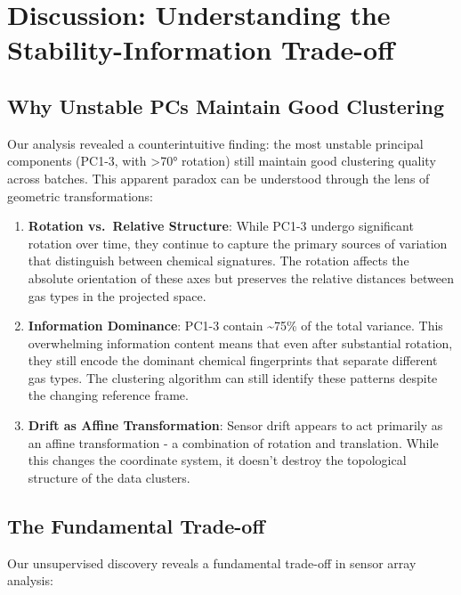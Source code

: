 \documentclass[
  letterpaper,
  DIV=11,
  numbers=noendperiod]{scrartcl}
\begin{document}
\section{Discussion: Understanding the Stability-Information
Trade-off}\label{discussion-understanding-the-stability-information-trade-off}

\subsection{Why Unstable PCs Maintain Good
Clustering}\label{why-unstable-pcs-maintain-good-clustering}

Our analysis revealed a counterintuitive finding: the most unstable
principal components (PC1-3, with \textgreater70° rotation) still
maintain good clustering quality across batches. This apparent paradox
can be understood through the lens of geometric transformations:

\begin{enumerate}
\def\labelenumi{\arabic{enumi}.}
\item
  \textbf{Rotation vs.~Relative Structure}: While PC1-3 undergo
  significant rotation over time, they continue to capture the primary
  sources of variation that distinguish between chemical signatures. The
  rotation affects the absolute orientation of these axes but preserves
  the relative distances between gas types in the projected space.
\item
  \textbf{Information Dominance}: PC1-3 contain \textasciitilde75\% of
  the total variance. This overwhelming information content means that
  even after substantial rotation, they still encode the dominant
  chemical fingerprints that separate different gas types. The
  clustering algorithm can still identify these patterns despite the
  changing reference frame.
\item
  \textbf{Drift as Affine Transformation}: Sensor drift appears to act
  primarily as an affine transformation - a combination of rotation and
  translation. While this changes the coordinate system, it doesn't
  destroy the topological structure of the data clusters.
\end{enumerate}

\subsection{The Fundamental Trade-off}\label{the-fundamental-trade-off}

Our unsupervised discovery reveals a fundamental trade-off in sensor
array analysis:
\end{document}
